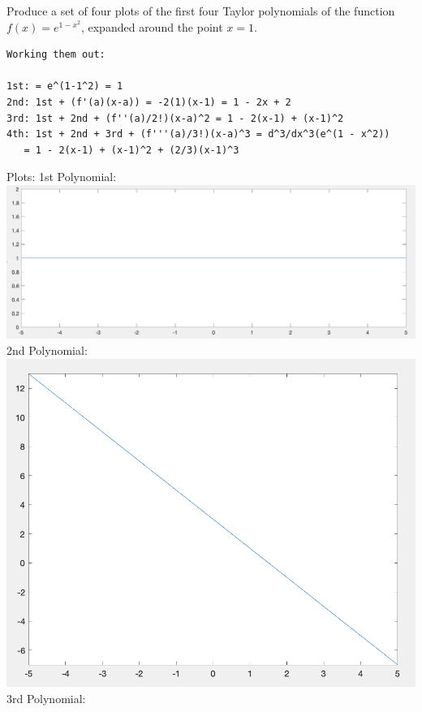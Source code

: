 \documentclass[12pt]{article}
\makeatletter
\theoremstyle{homework}
\newenvironment{exercise}[1]
{\def\@currentlabel{#1}\exercisecore}
{\endexercisecore}
\makeatother
\begin{document}
\begin{exercise}{Chapter 4: 18}
Produce a set of four plots of the first four Taylor polynomials of
the function $f(x)=e^{1-x^2}$, expanded around the point $x=1$.
\end{exercise}
\begin{verbatim}
Working them out: 

1st: = e^(1-1^2) = 1
2nd: 1st + (f'(a)(x-a)) = -2(1)(x-1) = 1 - 2x + 2
3rd: 1st + 2nd + (f''(a)/2!)(x-a)^2 = 1 - 2(x-1) + (x-1)^2
4th: 1st + 2nd + 3rd + (f'''(a)/3!)(x-a)^3 = d^3/dx^3(e^(1 - x^2)) 
   = 1 - 2(x-1) + (x-1)^2 + (2/3)(x-1)^3
\end{verbatim}
Plots:
\newline
1st Polynomial:
\newline
\includegraphics[scale=0.5]{1st.png}
\newline
2nd Polynomial:
\newline
\includegraphics[scale=0.5]{2nd.png}
\newline
3rd Polynomial:
\newline
\end{document}
